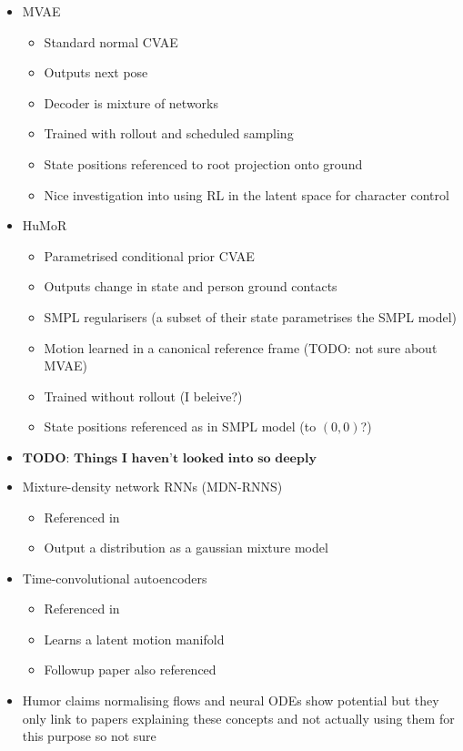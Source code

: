 \begin{itemize}
    \item MVAE \cite{humor}
    \begin{itemize}
        \item Standard normal CVAE
        \item Outputs next pose
        \item Decoder is mixture of networks
        \item Trained with rollout and scheduled sampling
        \item State positions referenced to root projection onto ground
        \item Nice investigation into using RL in the latent space for character control
    \end{itemize}
    \item HuMoR \cite{humor}
    \begin{itemize}
        \item Parametrised conditional prior CVAE
        \item Outputs change in state and person ground contacts
        \item SMPL regularisers (a subset of their state parametrises the SMPL model)
        \item Motion learned in a canonical reference frame (TODO: not sure about MVAE)
        \item Trained without rollout (I beleive?) 
        \item State positions referenced as in SMPL model (to $(0,0)$?)
    \end{itemize}

    \item $\textbf{TODO: Things I haven't looked into so deeply}$
    \item Mixture-density network RNNs (MDN-RNNS)
    \begin{itemize}
        \item Referenced in \cite{MVAE}
        \item Output a distribution as a gaussian mixture model
    \end{itemize}
    \item Time-convolutional autoencoders
    \begin{itemize}
        \item Referenced in \cite{MVAE}
        \item Learns a latent motion manifold
        \item Followup paper also referenced
    \end{itemize}
    \item Humor claims normalising flows and neural ODEs show potential but they only link to papers explaining these concepts and not actually using them for this purpose so not sure
\end{itemize}


